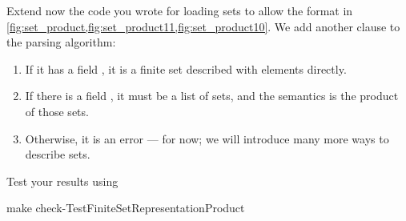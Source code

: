 \begin{codeexercise}
Extend now the code you wrote for loading sets to allow the format in \cref{fig:set_product,fig:set_product11,fig:set_product10}.
We add another clause to the parsing algorithm:
\begin{enumerate}
  \item If it has a field , it is a finite set described with elements directly.
  \item If there is a field , it must be a list of sets, and the semantics is the product of those sets.
  \item Otherwise, it is an error --- for now; we will introduce many more ways to describe sets.
\end{enumerate}
Test your results using
  \begin{console}
    make check-TestFiniteSetRepresentationProduct
  \end{console}
\end{codeexercise}